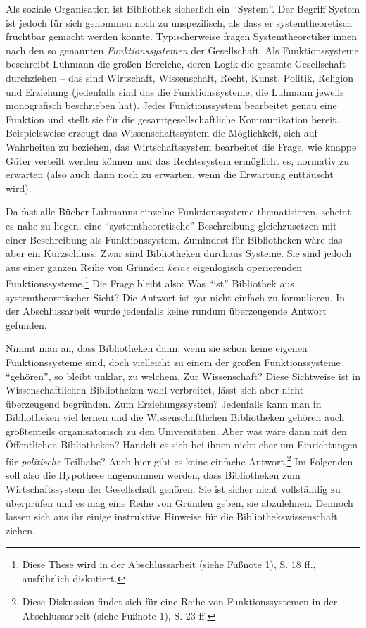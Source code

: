 \documentclass[a4paper,
fontsize=11pt,
oneside,
numbers=noperiodatend,
parskip=half-,
bibliography=totoc,
final
]{scrartcl}
\begin{document}
Als soziale Organisation ist Bibliothek sicherlich ein \enquote{System}.
Der Begriff System ist jedoch für sich genommen noch zu unspezifisch,
als dass er systemtheoretisch fruchtbar gemacht werden könnte.
Typischerweise fragen Systemtheoretiker:innen nach den so genannten
\emph{Funktionssystemen} der Gesellschaft. Als Funktionssysteme
beschreibt Luhmann die großen Bereiche, deren Logik die gesamte
Gesellschaft durchziehen -- das sind Wirtschaft, Wissenschaft, Recht,
Kunst, Politik, Religion und Erziehung (jedenfalls sind das die
Funktionssysteme, die Luhmann jeweils monografisch beschrieben hat).
Jedes Funktionssystem bearbeitet genau eine Funktion und stellt sie für
die gesamtgesellschaftliche Kommunikation bereit. Beispielsweise erzeugt
das Wissenschaftssystem die Möglichkeit, sich auf Wahrheiten zu
beziehen, das Wirtschaftssystem bearbeitet die Frage, wie knappe Güter
verteilt werden können und das Rechtssystem ermöglicht es, normativ zu
erwarten (also auch dann noch zu erwarten, wenn die Erwartung enttäuscht
wird).

Da fast alle Bücher Luhmanns einzelne Funktionssysteme thematisieren,
scheint es nahe zu liegen, eine \enquote{systemtheoretische}
Beschreibung gleichzusetzen mit einer Beschreibung als Funktionssystem.
Zumindest für Bibliotheken wäre das aber ein Kurzschluss: Zwar sind
Bibliotheken durchaus Systeme. Sie sind jedoch aus einer ganzen Reihe
von Gründen \emph{keine} eigenlogisch operierenden
Funktionssysteme.\footnote{Diese These wird in der Abschlussarbeit
  (siehe Fußnote 1), S. 18 ff., ausführlich diskutiert.} Die Frage
bleibt also: Was \enquote{ist} Bibliothek aus systemtheoretischer Sicht?
Die Antwort ist gar nicht einfach zu formulieren. In der Abschlussarbeit
wurde jedenfalls keine rundum überzeugende Antwort gefunden.

Nimmt man an, dass Bibliotheken dann, wenn sie schon keine eigenen
Funktionssysteme sind, doch vielleicht zu einem der großen
Funktionssysteme \enquote{gehören}, so bleibt unklar, zu welchem. Zur
Wissenschaft? Diese Sichtweise ist in Wissenschaftlichen Bibliotheken
wohl verbreitet, lässt sich aber nicht überzeugend begründen. Zum
Erziehungssystem? Jedenfalls kann man in Bibliotheken viel lernen und
die Wissenschaftlichen Bibliotheken gehören auch größtenteils
organisatorisch zu den Universitäten. Aber was wäre dann mit den
Öffentlichen Bibliotheken? Handelt es sich bei ihnen nicht eher um
Einrichtungen für \emph{politische} Teilhabe? Auch hier gibt es keine
einfache Antwort.\footnote{Diese Diskussion findet sich für eine Reihe
  von Funktionssystemen in der Abschlussarbeit (siehe Fußnote 1), S. 23
  ff.} Im Folgenden soll also die Hypothese angenommen werden, dass
Bibliotheken zum Wirtschaftssystem der Gesellschaft gehören. Sie ist
sicher nicht vollständig zu überprüfen und es mag eine Reihe von Gründen
geben, sie abzulehnen. Dennoch lassen sich aus ihr einige instruktive
Hinweise für die Bibliothekswissenschaft ziehen.
\end{document}
